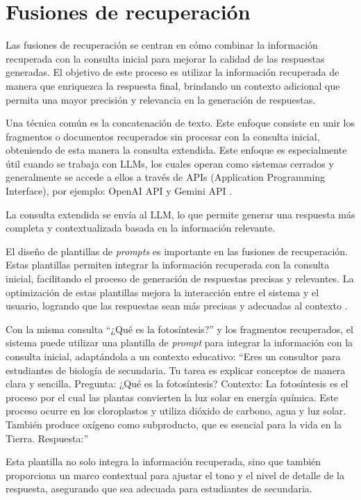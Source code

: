 \section{Fusiones de recuperación}

Las fusiones de recuperación se centran en cómo combinar la información recuperada con la consulta inicial para mejorar la calidad de las respuestas generadas. El objetivo de este proceso es utilizar la información recuperada de manera que enriquezca la respuesta final, brindando un contexto adicional que permita una mayor precisión y relevancia en la generación de respuestas.

Una técnica común es la concatenación de texto. Este enfoque consiste en unir los fragmentos o documentos recuperados sin procesar con la consulta inicial, obteniendo de esta manera la consulta extendida. Este enfoque es especialmente útil cuando se trabaja con LLMs, los cuales operan como sistemas cerrados y generalmente se accede a ellos a través de APIs (Application Programming Interface), por ejemplo: OpenAI API \cite{openai_api} y Gemini API \cite{gemini_model}.

La consulta extendida se envía al LLM, lo que permite generar una respuesta más completa y contextualizada basada en la información relevante.

El diseño de plantillas de \textit{prompts} es importante en las fusiones de recuperación. Estas plantillas permiten integrar la información recuperada con la consulta inicial, facilitando el proceso de generación de respuestas precisas y relevantes. La optimización de estas plantillas mejora la interacción entre el sistema y el usuario, logrando que las respuestas sean más precisas y adecuadas al contexto \cite{sahoo2024systematicsurveypromptengineering}.

Con la misma consulta ``¿Qué es la fotosíntesis?'' y los fragmentos recuperados, el sistema puede utilizar una plantilla de \textit{prompt} para integrar la información con la consulta inicial, adaptándola a un contexto educativo:
``Eres un consultor para estudiantes de biología de secundaria. Tu tarea es explicar conceptos de manera clara y sencilla. Pregunta: ¿Qué es la fotosíntesis? Contexto: La fotosíntesis es el proceso por el cual las plantas convierten la luz solar en energía química. Este proceso ocurre en los cloroplastos y utiliza dióxido de carbono, agua y luz solar. También produce oxígeno como subproducto, que es esencial para la vida en la Tierra. Respuesta:''

Esta plantilla no solo integra la información recuperada, sino que también proporciona un marco contextual para ajustar el tono y el nivel de detalle de la respuesta, asegurando que sea adecuada para estudiantes de secundaria.

